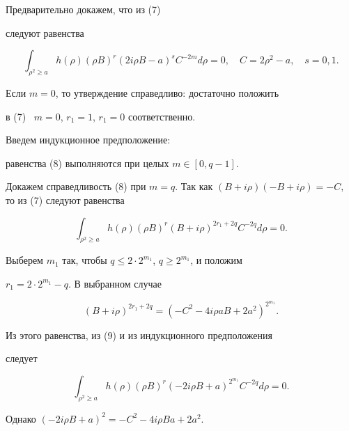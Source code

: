 \begin{pf}


Предварительно докажем, что из (7)


следуют равенства


\begin{equation}


\int_{\rho^{2} \ge a} h(\rho) (\rho B)^{r} (2i\rho B-a)^s C^{-2m} d\rho =0,


\quad C=2\rho^2-a,\quad s=0,1. 


\end{equation}


Если $m=0$, то утверждение справедливо: достаточно положить


в (7) \ $m=0$, $r_{1}=1$, $r_1=0$ соответственно. 


Введем индукционное предположение:


равенства (8) выполняются при целых $m \in [0, q-1]$.





Докажем справедливость (8) при $m=q$. Так как $ (B+i\rho)


(-B+i\rho)=-C, $ то из (7) следуют равенства


\begin{equation}


\int_{\rho^{2} \ge a} h(\rho) (\rho B)^{r} (B+i\rho)^{2r_{1}+2q} C^{-2q}


d\rho =0. 


\end{equation}


Выберем $m_1$ так, чтобы $q\le2\cdot 2^{m_1}$, $q\ge2^{m_1}$, и положим


$r_1=2\cdot 2^{m_1}-q$. В выбранном случае


$$


(B+i\rho)^{2r_{1}+2q}= (-C^{2} -4i\rho a B+2 a^{2})


^{2^{m_{1}}}.


$$


Из этого равенства, из (9) и из индукционного предположения


следует


\begin{equation}


\int_{\rho^{2} \ge a} h(\rho) (\rho B)^{r} (-2i\rho B +a)^{2^{m_{1}}}


C^{-2q} d\rho =0.


\end{equation}


Однако $ (-2i\rho B+a)^{2}=-C^{2}-4i\rho Ba +2a^{2}$. 



\end{pf}
